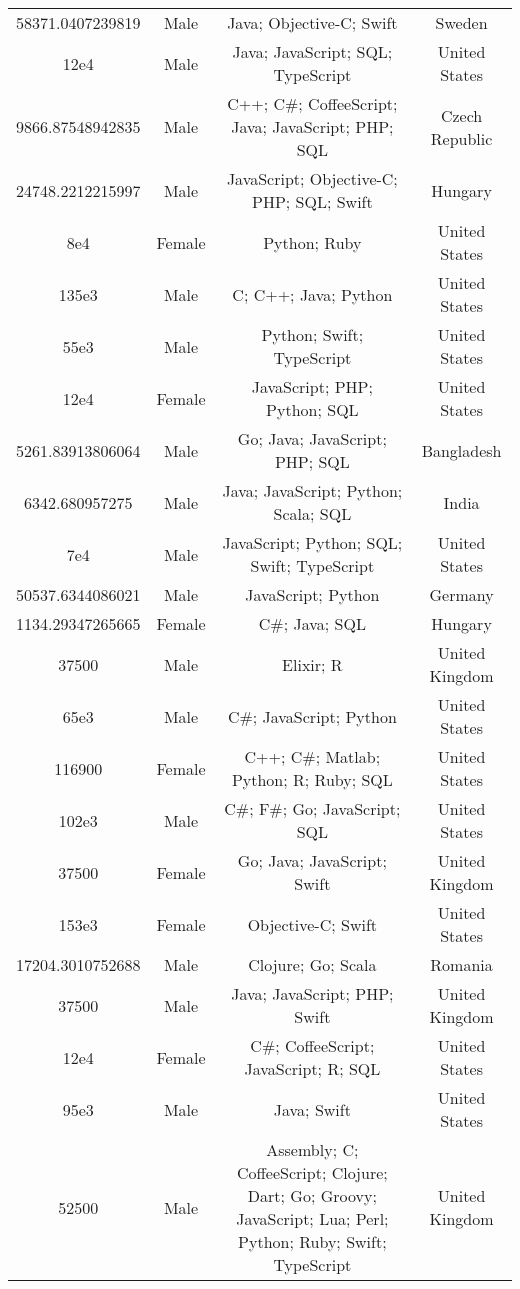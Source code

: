 \begin{center}
\begin{tabular}{ |c|c|c|c| }
58371.0407239819  &  Male  &  Java; Objective-C; Swift  &  Sweden  \\ 
12e4  &  Male  &  Java; JavaScript; SQL; TypeScript  &  United States  \\ 
9866.87548942835  &  Male  &  C++; C\#; CoffeeScript; Java; JavaScript; PHP; SQL  &  Czech Republic  \\ 
24748.2212215997  &  Male  &  JavaScript; Objective-C; PHP; SQL; Swift  &  Hungary  \\ 
8e4  &  Female  &  Python; Ruby  &  United States  \\ 
135e3  &  Male  &  C; C++; Java; Python  &  United States  \\ 
55e3  &  Male  &  Python; Swift; TypeScript  &  United States  \\ 
12e4  &  Female  &  JavaScript; PHP; Python; SQL  &  United States  \\ 
5261.83913806064  &  Male  &  Go; Java; JavaScript; PHP; SQL  &  Bangladesh  \\ 
6342.680957275  &  Male  &  Java; JavaScript; Python; Scala; SQL  &  India  \\ 
7e4  &  Male  &  JavaScript; Python; SQL; Swift; TypeScript  &  United States  \\ 
50537.6344086021  &  Male  &  JavaScript; Python  &  Germany  \\ 
1134.29347265665  &  Female  &  C\#; Java; SQL  &  Hungary  \\ 
37500  &  Male  &  Elixir; R  &  United Kingdom  \\ 
65e3  &  Male  &  C\#; JavaScript; Python  &  United States  \\ 
116900  &  Female  &  C++; C\#; Matlab; Python; R; Ruby; SQL  &  United States  \\ 
102e3  &  Male  &  C\#; F\#; Go; JavaScript; SQL  &  United States  \\ 
37500  &  Female  &  Go; Java; JavaScript; Swift  &  United Kingdom  \\ 
153e3  &  Female  &  Objective-C; Swift  &  United States  \\ 
17204.3010752688  &  Male  &  Clojure; Go; Scala  &  Romania  \\ 
37500  &  Male  &  Java; JavaScript; PHP; Swift  &  United Kingdom  \\ 
12e4  &  Female  &  C\#; CoffeeScript; JavaScript; R; SQL  &  United States  \\ 
95e3  &  Male  &  Java; Swift  &  United States  \\ 
52500  &  Male  &  Assembly; C; CoffeeScript; Clojure; Dart; Go; Groovy; JavaScript; Lua; Perl; Python; Ruby; Swift; TypeScript  &  United Kingdom  \\ 

\end{tabular}
\end{center}
